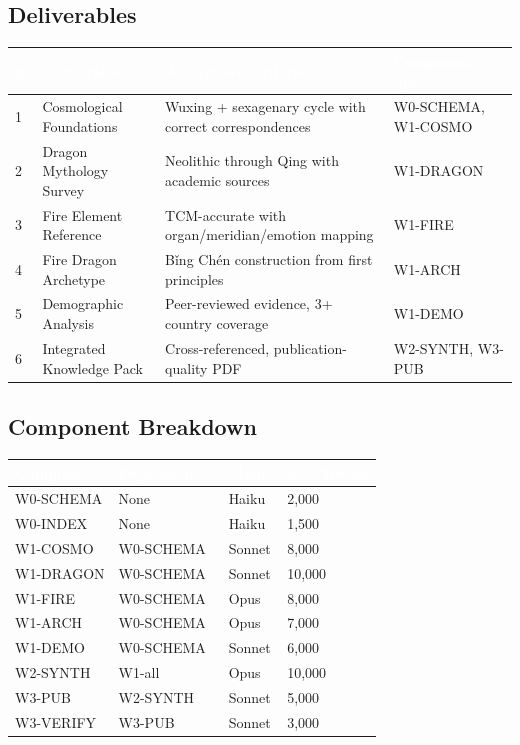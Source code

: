 \documentclass[11pt,letterpaper]{article}
\newcommand{\tableheader}[1]{\textbf{\sffamily\textcolor{white}{#1}}}
\begin{document}
\subsection{Deliverables}

\begin{center}
\begin{tabularx}{\textwidth}{C{0.5cm}L{3cm}XL{2.5cm}}
\toprule
{}
\tableheader{\#} & \tableheader{Deliverable} & \tableheader{Acceptance Criteria} & \tableheader{Component Spec} \\
 & Cosmological Foundations & Wuxing + sexagenary cycle with correct correspondences & W0-SCHEMA, W1-COSMO \\
2 & Dragon Mythology Survey & Neolithic through Qing with academic sources & W1-DRAGON \\
3 & Fire Element Reference & TCM-accurate with organ/meridian/emotion mapping & W1-FIRE \\
4 & Fire Dragon Archetype & Bǐng Chén construction from first principles & W1-ARCH \\
5 & Demographic Analysis & Peer-reviewed evidence, 3+ country coverage & W1-DEMO \\
6 & Integrated Knowledge Pack & Cross-referenced, publication-quality PDF & W2-SYNTH, W3-PUB \\
\bottomrule
\end{tabularx}
\end{center}

\subsection{Component Breakdown}

\begin{center}
\begin{tabularx}{\textwidth}{L{2.5cm}L{2.5cm}C{1.5cm}C{1.5cm}}
\toprule
{}
\tableheader{Component} & \tableheader{Dependencies} & \tableheader{Model} & \tableheader{Est. Tokens} \\
\midrule
W0-SCHEMA & None & Haiku & 2,000 \\
W0-INDEX & None & Haiku & 1,500 \\
W1-COSMO & W0-SCHEMA & Sonnet & 8,000 \\
W1-DRAGON & W0-SCHEMA & Sonnet & 10,000 \\
W1-FIRE & W0-SCHEMA & Opus & 8,000 \\
W1-ARCH & W0-SCHEMA & Opus & 7,000 \\
W1-DEMO & W0-SCHEMA & Sonnet & 6,000 \\
W2-SYNTH & W1-all & Opus & 10,000 \\
W3-PUB & W2-SYNTH & Sonnet & 5,000 \\
W3-VERIFY & W3-PUB & Sonnet & 3,000 \\
\bottomrule
\end{tabularx}
\end{center}
\end{document}
